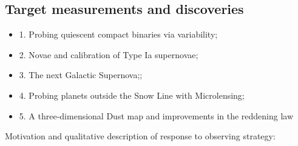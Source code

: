 
\subsection{Target measurements and discoveries}
\label{sec:keyword:MW_Disk_targets}



\begin{itemize}
  \item 1. Probing quiescent compact binaries via variability;
  \item 2. Novae and calibration of Type Ia supernovae;
  \item 3. The next Galactic Supernova;;
  \item 4. Probing planets outside the Snow Line with Microlensing;
  \item 5. A three-dimensional Dust map and improvements in the reddening law
\end{itemize}

Motivation and qualitative description of response to observing strategy:

